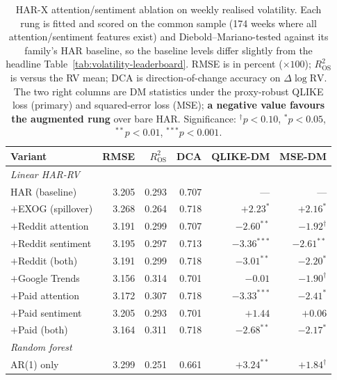 \documentclass[12pt, a4paper]{article}
\begin{document}
\begin{table}[htbp]
    \centering
    \footnotesize
    \setlength{\tabcolsep}{5pt}
    \caption{HAR-X attention/sentiment ablation on weekly realised volatility. Each rung is
    fitted and scored on the common sample (174 weeks where all attention/sentiment features
    exist) and Diebold--Mariano-tested against its family's HAR baseline, so the baseline levels
    differ slightly from the headline Table~\ref{tab:volatility-leaderboard}. RMSE is in percent
    (\(\times 100\)); \(R^2_{\text{OS}}\) is versus the RV mean; DCA is direction-of-change
    accuracy on \(\Delta\log\mathrm{RV}\). The two right columns are DM statistics under the
    proxy-robust QLIKE loss (primary) and squared-error loss (MSE); \textbf{a negative value
    favours the augmented rung} over bare HAR. Significance: \(^\dagger p<0.10\), \(^* p<0.05\),
    \(^{**} p<0.01\), \(^{***} p<0.001\).}
    \label{tab:har-ablation}
    \begin{tabular}{l r r r r r}
        \toprule
        Variant & RMSE & \(R^2_{\text{OS}}\) & DCA & QLIKE-DM & MSE-DM \\
        \midrule
        \multicolumn{6}{l}{\textit{Linear HAR-RV}}\\
        HAR (baseline)         & 3.205 & 0.293 & 0.707 & ---            & ---           \\
        \(+\)EXOG (spillover)  & 3.268 & 0.264 & 0.718 & $+2.23^{*}$    & $+2.16^{*}$   \\
        \(+\)Reddit attention  & 3.191 & 0.299 & 0.707 & $-2.60^{**}$   & $-1.92^{\dagger}$ \\
        \(+\)Reddit sentiment  & 3.195 & 0.297 & 0.713 & $-3.36^{***}$  & $-2.61^{**}$  \\
        \(+\)Reddit (both)     & 3.191 & 0.299 & 0.718 & $-3.01^{**}$   & $-2.20^{*}$   \\
        \(+\)Google Trends     & 3.156 & 0.314 & 0.701 & $-0.01$        & $-1.90^{\dagger}$ \\
        \(+\)Paid attention    & 3.172 & 0.307 & 0.718 & $-3.33^{***}$  & $-2.41^{*}$   \\
        \(+\)Paid sentiment    & 3.205 & 0.293 & 0.701 & $+1.44$        & $+0.06$       \\
        \(+\)Paid (both)       & 3.164 & 0.311 & 0.718 & $-2.68^{**}$   & $-2.17^{*}$   \\
        \midrule
        \multicolumn{6}{l}{\textit{Random forest}}\\
        AR(1) only             & 3.299 & 0.251 & 0.661 & $+3.24^{**}$   & $+1.84^{\dagger}$ \\

\end{tabular}
\end{table}
\end{document}
